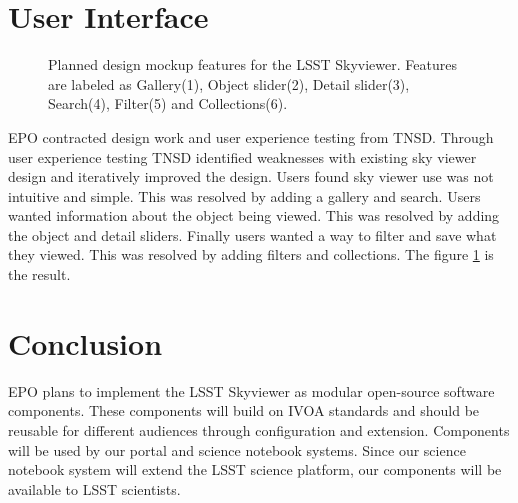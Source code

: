 \documentclass[11pt,twoside]{article}
\begin{document}
\section{User Interface}
\begin{figure}[!ht]
  \caption{Planned design mockup features for the LSST Skyviewer. Features are labeled as Gallery(1), Object slider(2), Detail slider(3), Search(4), Filter(5) and Collections(6).}
  \label{P1-140_fig1}
\end{figure}
EPO contracted design work and user experience testing from TNSD. Through user experience testing TNSD identified weaknesses with existing sky viewer design and iteratively improved the design. Users found sky viewer use was not intuitive and simple. This was resolved by adding a gallery and search. Users wanted information about the object being viewed. This was resolved by adding the object and detail sliders. Finally users wanted a way to filter and save what they viewed. This was resolved by adding filters and collections. The figure \ref{P1-140_fig1} is the result.



\section{Conclusion}
EPO plans to implement the LSST Skyviewer as modular open-source software components. These components will build on IVOA standards and should be reusable for different audiences through configuration and extension. Components will be used by our portal and science notebook systems. Since our science notebook system will extend the LSST science platform, our components will be available to LSST scientists.
\end{document}
